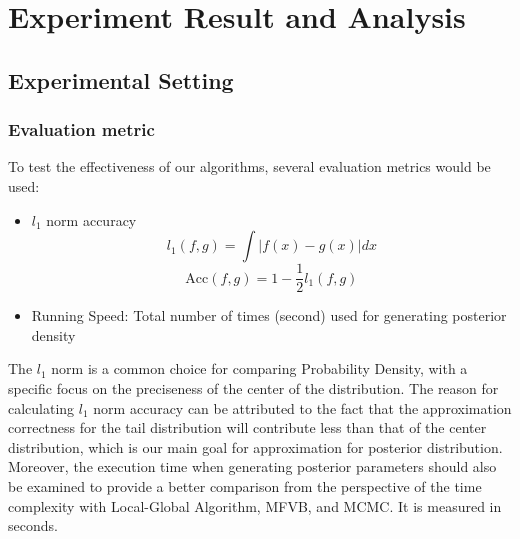 \chapter{Experiment Result and Analysis}
\label{Chapter4}
\section{Experimental Setting}
\subsection{Evaluation metric}
To test the effectiveness of our algorithms, several evaluation metrics would be used:

\begin{itemize}
	\item $l_1$ norm accuracy 
	\begin{equation}
		l_1(f,g) = \int |f(x)-g(x)|dx
	\end{equation}
	\begin{equation}
		\text{Acc}(f,g) = 1 - \frac{1}{2}l_1(f,g) 
	\end{equation}
	\item Running Speed: Total number of times (second) used for generating posterior density
	
\end{itemize}
The $l_1$ norm is a common choice for comparing Probability Density, with a specific focus on the preciseness of the center of the distribution. The reason for calculating $l_1$ norm accuracy can be attributed to the fact that the approximation correctness for the tail distribution will contribute less than that of the center distribution, which is our main goal for approximation for posterior distribution.
Moreover, the execution time when generating posterior parameters should also be examined to provide a better comparison from the perspective of the time complexity with Local-Global Algorithm, MFVB, and MCMC. It is measured in seconds.

%

